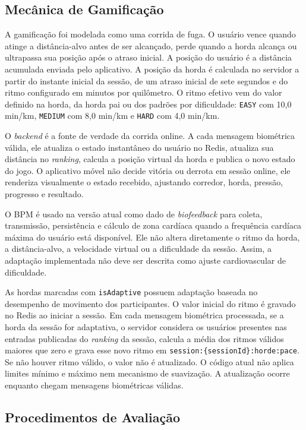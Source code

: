 \subsection{Mecânica de Gamificação}

A gamificação foi modelada como uma corrida de fuga. O usuário vence quando atinge a distância-alvo antes de ser alcançado, perde quando a horda alcança ou ultrapassa sua posição após o atraso inicial. A posição do usuário é a distância acumulada enviada pelo aplicativo. A posição da horda é calculada no servidor a partir do instante inicial da sessão, de um atraso inicial de sete segundos e do ritmo configurado em minutos por quilômetro. O ritmo efetivo vem do valor definido na horda, da horda pai ou dos padrões por dificuldade: \texttt{EASY} com 10,0 min/km, \texttt{MEDIUM} com 8,0 min/km e \texttt{HARD} com 4,0 min/km.

O \textit{backend} é a fonte de verdade da corrida online. A cada mensagem biométrica válida, ele atualiza o estado instantâneo do usuário no Redis, atualiza sua distância no \textit{ranking}, calcula a posição virtual da horda e publica o novo estado do jogo. O aplicativo móvel não decide vitória ou derrota em sessão online, ele renderiza visualmente o estado recebido, ajustando corredor, horda, pressão, progresso e resultado.

O BPM é usado na versão atual como dado de \textit{biofeedback} para coleta, transmissão, persistência e cálculo de zona cardíaca quando a frequência cardíaca máxima do usuário está disponível. Ele não altera diretamente o ritmo da horda, a distância-alvo, a velocidade virtual ou a dificuldade da sessão. Assim, a adaptação implementada não deve ser descrita como ajuste cardiovascular de dificuldade.

As hordas marcadas com \texttt{isAdaptive} possuem adaptação baseada no desempenho de movimento dos participantes. O valor inicial do ritmo é gravado no Redis ao iniciar a sessão. Em cada mensagem biométrica processada, se a horda da sessão for adaptativa, o servidor considera os usuários presentes nas entradas publicadas do \textit{ranking} da sessão, calcula a média dos ritmos válidos maiores que zero e grava esse novo ritmo em \texttt{session:\{sessionId\}:horde:pace}. Se não houver ritmo válido, o valor não é atualizado. O código atual não aplica limites mínimo e máximo nem mecanismo de suavização. A atualização ocorre enquanto chegam mensagens biométricas válidas.

\subsection{Procedimentos de Avaliação}

